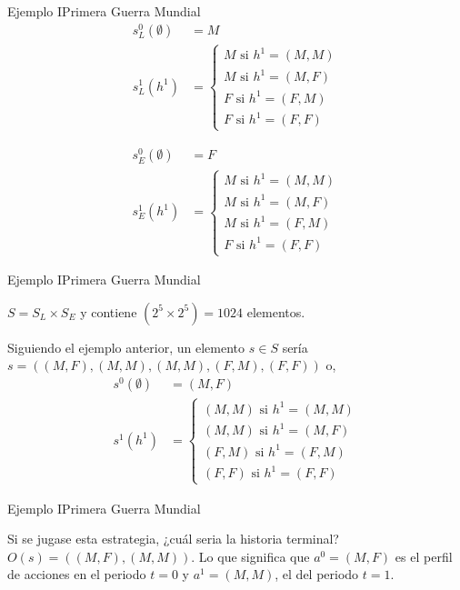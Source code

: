 \documentclass[notes, 11pt]{beamer} %
\newenvironment{wideitemize}{\itemize\addtolength{\itemsep}{10pt}}{\enditemize}
\begin{document}
\begin{frame}{Ejemplo I}{Primera Guerra Mundial}
	\begin{align*}
		s_{L}^{0}(\emptyset) &= M \\
		s_{L}^{1}(h^{1}) & = \begin{cases}
			M \text{ si } h^{1} = (M,M) \\
			M \text{ si } h^{1} = (M,F) \\
			F \text{ si } h^{1} = (F,M) \\
			F \text{ si } h^{1} = (F,F)
		\end{cases}
	\end{align*}

	\begin{align*}
		s_{E}^{0}(\emptyset) &= F \\
		s_{E}^{1}(h^{1}) & = \begin{cases}
			M \text{ si } h^{1} = (M,M) \\
			M \text{ si } h^{1} = (M,F) \\
			M \text{ si } h^{1} = (F,M) \\
			F \text{ si } h^{1} = (F,F)
		\end{cases}
	\end{align*}

\end{frame}

\begin{frame}{Ejemplo I}{Primera Guerra Mundial}
	\begin{wideitemize}
		\item<1-> $S = S_{L} \times S_{E}$ y contiene $(2^{5} \times 2^{5}) = 1024$ elementos. 
		\item<2-> Siguiendo el ejemplo anterior, un elemento $s \in S$ ser\'ia $s = ( (M,F), (M,M), (M,M), (F,M), (F,F) )$ o,
		\begin{align*}
			s^{0}(\emptyset) & = (M,F) \\
			s^{1}(h^{1}) & = \begin{cases}
				(M,M) \text{ si } h^{1} = (M,M) \\
				(M,M) \text{ si } h^{1} = (M,F) \\
				(F,M) \text{ si } h^{1} = (F,M) \\
				(F,F) \text{ si } h^{1} = (F,F) 
			\end{cases}
		\end{align*}
	\end{wideitemize}
\end{frame}


\begin{frame}{Ejemplo I}{Primera Guerra Mundial}
	\begin{wideitemize}
		\item<1-> Si se jugase esta estrategia, ¿cu\'al seria la historia terminal? $O(s) = ( (M,F), (M,M) )$. Lo que significa que $a^{0} = (M,F)$ es el perfil de acciones en el periodo $t=0$ y $a^{1} = (M,M)$, el del periodo $t=1$.
	\end{wideitemize}
\end{frame}
\end{document}

